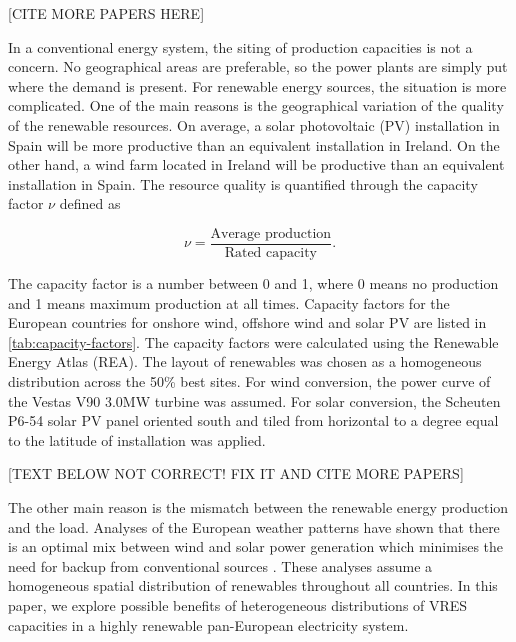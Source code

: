 \documentclass[a4paper, 12pt, sort&compress]{elsarticle}%
\begin{document}
[CITE MORE PAPERS HERE]

In a conventional energy system, the siting of production capacities is not
a concern. No geographical areas are preferable, so the power plants
are simply put where the demand is present. For renewable energy
sources, the situation is more complicated. One of the main reasons is
the geographical variation of the quality of the renewable
resources. On average, a solar photovoltaic (PV) installation in
Spain will be more productive than an equivalent installation in
Ireland. On the other hand, a wind farm located in Ireland will be
productive than an equivalent installation in Spain. The resource
quality is quantified through the capacity factor $\nu$ defined as

\begin{equation}
  \label{eq:1}
  \nu = \frac{\mbox{Average production}}{\mbox{Rated capacity}} .
\end{equation}

The capacity factor is a number between 0 and 1, where 0 means no
production and 1 means maximum production at all times. Capacity
factors for the European countries for onshore wind, offshore wind and
solar PV are listed in \cref{tab:capacity-factors}. The capacity
factors were calculated using the Renewable Energy Atlas\cite{REA}
(REA). The layout of renewables was chosen as a homogeneous
distribution across the 50\% best sites. For wind conversion, the
power curve of the Vestas V90 3.0MW turbine was assumed. For solar
conversion, the Scheuten P6-54 solar PV panel oriented south and tiled
from horizontal to a degree equal to the latitude of installation was
applied.




[TEXT BELOW NOT CORRECT! FIX IT AND CITE MORE PAPERS]

The other main reason is the mismatch between the renewable energy
production and the load. Analyses of the European weather patterns
have shown that there is an optimal mix between wind and solar power
generation which minimises the need for backup from conventional
sources \cite{Heide2010,Heide2011}. These analyses assume a
homogeneous spatial distribution of renewables throughout all
countries. In this paper, we explore possible benefits of
heterogeneous distributions of VRES capacities in a highly renewable
pan-European electricity system.
\end{document}
